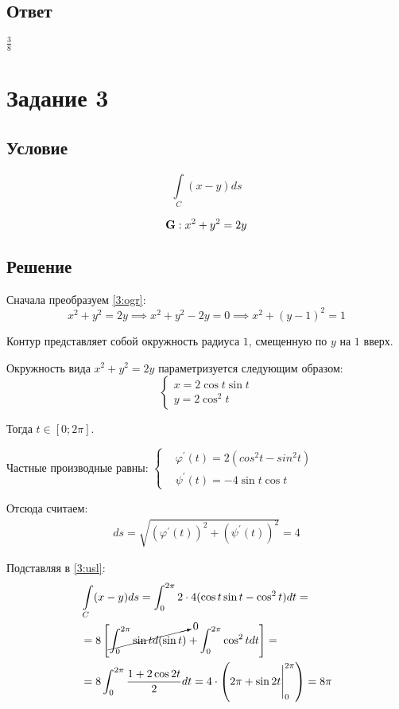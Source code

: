 \documentclass{report}
\newcommand*\task[1]{
       \chapter{#1}
       \section{Условие}
}
\newcommand*\coordchtwo[2]{
       \begin{cases}
              x = #1\\
              y = #2
       \end{cases}
}
\begin{document}
\section{Ответ}

$\frac{3}{8}$

\task{Задание 3}

\begin{equation}
    \label{3:usl}
    \int\limits_{C} (x - y)ds
\end{equation}

\begin{equation}
    \label{3:ogr}
    {\bf{G}}: x^2 + y^2 = 2y
\end{equation}

\section{Решение}

Сначала преобразуем \ref{3:ogr}:
$$
    x^2 + y^2 = 2y \implies x^2 + y^2 - 2y = 0 \implies x^2 + (y - 1)^2 = 1
$$

Контур представляет собой окружность радиуса $1$, смещенную по $y$ на $1$ вверх.


Окружность вида $x^2 + y^2 = 2y$ параметризуется следующим образом:
$$
    \coordchtwo{2 \cos t \sin t}{2 \cos^2 t}
$$

Тогда $t \in [0; 2\pi]$.

Частные производные равны:
$
    \begin{cases}
         & \varphi^{\prime}(t) = 2(cos^2 t - sin^2 t) \\
         & \psi^{\prime}(t) = -4 \sin t \cos t
    \end{cases}
$

Отсюда считаем:
\begin{align*}
    ds = \sqrt{(\varphi^{\prime}(t))^2 + (\psi^{\prime}(t))^2} = 4
\end{align*}

Подставляя в \ref{3:usl}:
\begin{align*}
     & \int\limits_{C} (x - y)ds = \int_{0}^{2\pi}2\cdot 4 (\cos t \sin t - \cos^2 t)dt =                              \\
     & = 8 \left[ \cancelto{0}{\int_{0}^{2\pi} \sin t d(\sin t)} + \int_{0}^{2\pi} \cos^2 t dt \right] =               \\
     & = 8 \int_{0}^{2\pi} \frac{1 + 2\cos 2t}{2} dt = 4 \cdot \left( 2\pi + \sin 2t \Biggr|_{0}^{2\pi} \right) = 8\pi
\end{align*}
\end{document}
